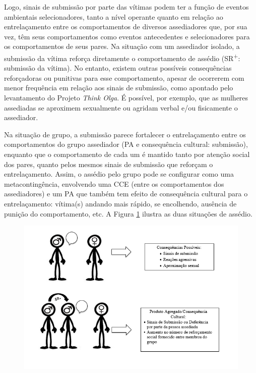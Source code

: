 Logo, sinais de submissão por parte das vítimas podem ter a função de eventos ambientais selecionadores, tanto a nível operante quanto em relação ao entrelaçamento entre os comportamentos de diversos assediadores que, por sua vez, têm seus comportamentos como eventos antecedentes e selecionadores para os comportamentos de seus pares. Na situação com um assediador isolado, a submissão da vítima reforça diretamente o comportamento de assédio (SR\textsuperscript{+}: submissão da vítima). No entanto, existem outras possíveis consequências reforçadoras ou punitivas para esse comportamento, apesar de ocorrerem com menor frequência em relação aos sinais de submissão, como apontado pelo levantamento do Projeto \textit{Think Olga}. É possível, por exemplo, que as mulheres assediadas se aproximem sexualmente ou agridam verbal e/ou fisicamente o assediador.

Na situação de grupo, a submissão parece fortalecer o entrelaçamento entre os comportamentos do grupo assediador (PA e consequência cultural: submissão), enquanto que o comportamento de cada um é mantido tanto por atenção social dos pares, quanto pelos mesmos sinais de submissão que reforçam o entrelaçamento. Assim, o assédio pelo grupo pode se configurar como uma metacontingência, envolvendo uma CCE (entre os comportamentos dos assediadores) e um PA que também tem efeito de consequência cultural para o entrelaçamento: vítima(s) andando mais rápido, se encolhendo, ausência de punição do comportamento, etc. A Figura \ref{figura2} ilustra as duas situações de assédio.

\begin{figure}[h]
    \begin{center}
        \includegraphics[width=1\textwidth]{7/figura2}
        \label{figura2}
\end{center}
\end{figure}

